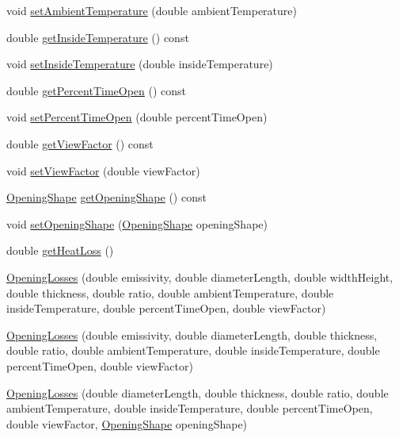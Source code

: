 \begin{DoxyCompactItemize}
\item 
void \hyperlink{class_opening_losses_a3624c9fad2a413871b7324f7e957a5ae}{set\+Ambient\+Temperature} (double ambient\+Temperature)
\item 
double \hyperlink{class_opening_losses_abe930dab77b1c855503ee51fdf66c88a}{get\+Inside\+Temperature} () const
\item 
void \hyperlink{class_opening_losses_a895dcaa81bbb3dc823ec903480f05262}{set\+Inside\+Temperature} (double inside\+Temperature)
\item 
double \hyperlink{class_opening_losses_aeefc3790a569008ff2e804033a9efea3}{get\+Percent\+Time\+Open} () const
\item 
void \hyperlink{class_opening_losses_a889b6aa25bf6d8fc8fb284ec0c2a1625}{set\+Percent\+Time\+Open} (double percent\+Time\+Open)
\item 
double \hyperlink{class_opening_losses_ae6633fab7a941e00b9770bee6a3af34d}{get\+View\+Factor} () const
\item 
void \hyperlink{class_opening_losses_a4e6c6f1549e01cd4b82b7505e403d643}{set\+View\+Factor} (double view\+Factor)
\item 
\hyperlink{class_opening_losses_a57f9759b6fd72a1b75aa885800e26157}{Opening\+Shape} \hyperlink{class_opening_losses_a5046cd699178e4edca774d0d0da7965a}{get\+Opening\+Shape} () const
\item 
void \hyperlink{class_opening_losses_a163778704e5bdd1809d05118504da027}{set\+Opening\+Shape} (\hyperlink{class_opening_losses_a57f9759b6fd72a1b75aa885800e26157}{Opening\+Shape} opening\+Shape)
\item 
double \hyperlink{class_opening_losses_a38112eb408f72e252b42a68a41a25d0f}{get\+Heat\+Loss} ()
\item 
\hyperlink{class_opening_losses_a366fd35fabdebffee916dee77d072543}{Opening\+Losses} (double emissivity, double diameter\+Length, double width\+Height, double thickness, double ratio, double ambient\+Temperature, double inside\+Temperature, double percent\+Time\+Open, double view\+Factor)
\item 
\hyperlink{class_opening_losses_a4a9e344af1207bcc48f63a3fc2201aeb}{Opening\+Losses} (double emissivity, double diameter\+Length, double thickness, double ratio, double ambient\+Temperature, double inside\+Temperature, double percent\+Time\+Open, double view\+Factor)
\item 
\hyperlink{class_opening_losses_a274bf4f0e302d03a270e7c61c1c43055}{Opening\+Losses} (double diameter\+Length, double thickness, double ratio, double ambient\+Temperature, double inside\+Temperature, double percent\+Time\+Open, double view\+Factor, \hyperlink{class_opening_losses_a57f9759b6fd72a1b75aa885800e26157}{Opening\+Shape} opening\+Shape)

\end{DoxyCompactItemize}
